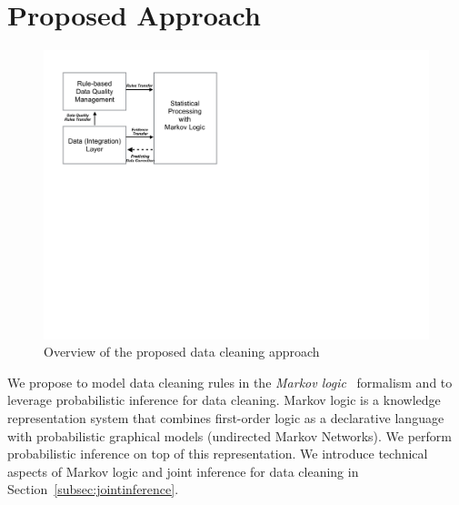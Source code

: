 
\section{Proposed Approach}
\label{sec:method}


 \begin{figure}[t]
 \centering
 \includegraphics[width=0.9\columnwidth]{img/system.pdf}
 \caption{%
Overview of the proposed data cleaning approach
}
 \label{fig:system}
\end{figure}     

We propose to model data cleaning rules in the \textit{Markov logic}~\cite{domingos2009markov} formalism and to leverage probabilistic inference for data cleaning. Markov logic is a knowledge representation system that combines first-order logic as a declarative language with probabilistic graphical models (undirected Markov Networks). We perform probabilistic inference on top of this representation. We introduce technical aspects of Markov logic and joint inference for data cleaning in Section~\ref{subsec:jointinference}.

